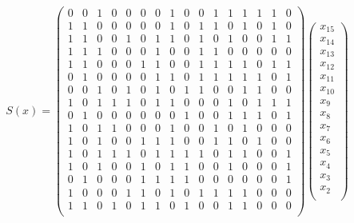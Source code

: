 \begin{align*}
S(x) =  
\begin{pmatrix}
0 & 0 & 1 & 0 & 0 & 0 & 0 & 1 & 0 & 0 & 1 & 1 & 1 & 1 & 1 & 0 \\
1 & 1 & 0 & 0 & 0 & 0 & 0 & 1 & 0 & 1 & 1 & 0 & 1 & 0 & 1 & 0 \\
1 & 1 & 0 & 0 & 1 & 0 & 1 & 1 & 0 & 1 & 0 & 1 & 0 & 0 & 1 & 1 \\
1 & 1 & 1 & 0 & 0 & 0 & 1 & 0 & 0 & 1 & 1 & 0 & 0 & 0 & 0 & 0 \\
1 & 1 & 0 & 0 & 0 & 1 & 1 & 0 & 0 & 1 & 1 & 1 & 1 & 0 & 1 & 1 \\
0 & 1 & 0 & 0 & 0 & 0 & 1 & 1 & 0 & 1 & 1 & 1 & 1 & 1 & 0 & 1 \\
0 & 0 & 1 & 0 & 1 & 0 & 1 & 0 & 1 & 1 & 0 & 0 & 1 & 1 & 0 & 0 \\
1 & 0 & 1 & 1 & 1 & 0 & 1 & 1 & 0 & 0 & 0 & 1 & 0 & 1 & 1 & 1 \\
0 & 1 & 0 & 0 & 0 & 0 & 0 & 0 & 1 & 0 & 0 & 1 & 1 & 1 & 0 & 1 \\
1 & 0 & 1 & 1 & 0 & 0 & 0 & 1 & 0 & 0 & 1 & 0 & 1 & 0 & 0 & 0 \\
1 & 0 & 1 & 0 & 0 & 1 & 1 & 1 & 0 & 0 & 1 & 1 & 0 & 1 & 0 & 0 \\
1 & 0 & 1 & 1 & 1 & 0 & 1 & 1 & 1 & 1 & 0 & 1 & 1 & 0 & 0 & 1 \\
1 & 0 & 1 & 0 & 0 & 1 & 0 & 1 & 1 & 0 & 0 & 1 & 0 & 0 & 0 & 1 \\
0 & 1 & 0 & 0 & 0 & 1 & 1 & 1 & 1 & 0 & 0 & 0 & 0 & 0 & 0 & 1 \\
1 & 0 & 0 & 0 & 1 & 1 & 0 & 1 & 0 & 1 & 1 & 1 & 1 & 0 & 0 & 0 \\
1 & 1 & 0 & 1 & 0 & 1 & 1 & 0 & 1 & 0 & 0 & 1 & 1 & 0 & 0 & 0 \\
\end{pmatrix}
\begin{pmatrix}
x_{15} \\
x_{14} \\
x_{13} \\
x_{12} \\
x_{11} \\
x_{10} \\
x_{9} \\
x_{8} \\
x_{7} \\
x_{6} \\
x_{5} \\
x_{4} \\
x_{3} \\
x_{2} \\

\end{pmatrix}
\end{align*}
